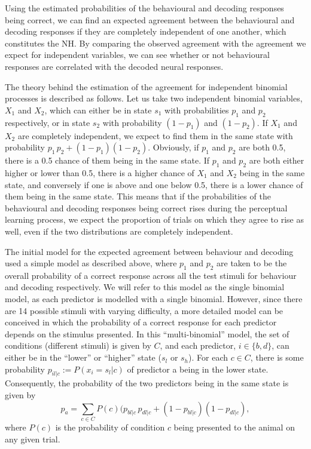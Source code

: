 Using the estimated probabilities of the behavioural and decoding responses being correct, we can find an expected agreement between the behavioural and decoding responses if they are completely independent of one another, which constitutes the \ac{NH}.
By comparing the observed agreement with the agreement we expect for independent variables, we can see whether or not behavioural responses are correlated with the decoded neural responses.

The theory behind the estimation of the agreement for independent binomial processes is described as follows.
Let us take two independent binomial variables, $X_1$ and $X_2$, which can either be in state $s_1$ with probabilities $p_1$ and $p_2$ respectively, or in state $s_2$ with probability $(1-p_1)$ and $(1-p_2)$.
If $X_1$ and $X_2$ are completely independent, we expect to find them in the same state with probability $p_1 \, p_2 + (1-p_1) (1-p_2)$.
Obviously, if $p_1$ and $p_2$ are both 0.5, there is a 0.5 chance of them being in the same state.
If $p_1$ and $p_2$ are both either higher or lower than 0.5, there is a higher chance of $X_1$ and $X_2$ being in the same state, and conversely if one is above and one below 0.5, there is a lower chance of them being in the same state.
This means that if the probabilities of the behavioural and decoding responses being correct rises during the perceptual learning process, we expect the proportion of trials on which they agree to rise as well, even if the two distributions are completely independent.

The initial model for the expected agreement between behaviour and decoding used a simple model as described above, where $p_1$ and $p_2$ are taken to be the overall probability of a correct response across all the test stimuli for behaviour and decoding respectively.
We will refer to this model as the single binomial model, as each predictor is modelled with a single binomial.
However, since there are 14 possible stimuli with varying difficulty, a more detailed model can be conceived in which the probability of a correct response for each predictor depends on the stimulus presented.
In this ``multi-binomial'' model, the set of conditions (different stimuli) is given by $C$, and each predictor, $i\in\{b,d\}$, can either be in the ``lower'' or ``higher'' state ($s_l$ or $s_h$).
For each $c\in C$, there is some probability $p_{il|c} := P(x_i=s_l|c)$ of predictor a being in the lower state.
Consequently, the probability of the two predictors being in the same state is given by
\begin{equation}
p_a = \sum_{c\in C} P(c) (p_{bl|c} \, p_{dl|c} + (1-p_{bl|c}) (1-p_{dl|c})
,\end{equation}
where $P(c)$ is the probability of condition $c$ being presented to the animal on any given trial.

